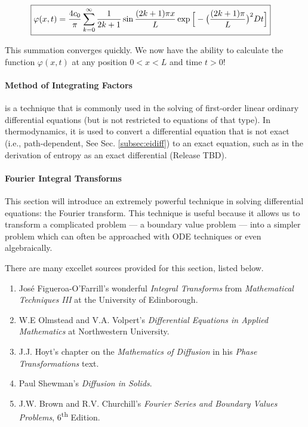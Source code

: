 \begin{align}
	\Aboxed{\varphi(x,t) = \frac{4 c_0}{\pi} \sum_{k=0}^\infty \frac{1}{2k+1} \sin{\frac{(2k+1)\pi x}{L}}\exp{\Big[-\big(\frac{(2k+1)\pi}{L}\big)^2 Dt\Big]}}
\end{align}

This summation converges quickly. We now have the ability to calculate the function $\varphi(x,t)$ at any position $0 < x < L$ and time $t > 0$!

\newpage
		\paragraph{Method of Integrating Factors} is a technique that is commonly used in the solving of first-order linear ordinary differential equations (but is not restricted to equations of that type). In thermodynamics, it is used to convert a differential equation that is not exact (i.e., path-dependent, See Sec. \ref{subsec:eidiff}) to an exact equation, such as in the derivation of entropy as an exact differential (Release TBD).

\newpage
		\paragraph{Fourier Integral Transforms} \label{sec:FourierMethods}
		This section will introduce an extremely powerful technique in solving differential equations: the Fourier transform. This technique is useful because it allows us to transform a complicated problem --- a boundary value problem --- into a simpler problem which can often be approached with ODE techniques or even algebraically.
		
		There are many excellet sources provided for this section, listed below.
		
		\begin{enumerate}
			\item Jos\'{e} Figueroa-O'Farrill's wonderful \textit{Integral Transforms} from \textit{Mathematical Techniques III} at the University of Edinborough.
			\item W.E Olmstead and V.A. Volpert's \textit{Differential Equations in Applied Mathematics} at Northwestern University.
			\item J.J. Hoyt's chapter on the \textit{Mathematics of Diffusion} in his \textit{Phase Transformations} text.
			\item Paul Shewman's \textit{Diffusion in Solids}.
			\item J.W. Brown and R.V. Churchill's \textit{Fourier Series and Boundary Values Problems}, 6\textsuperscript{th} Edition.
		\end{enumerate}
		
